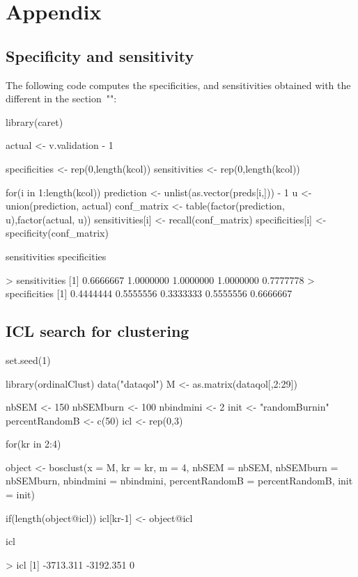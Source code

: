 \newpage 





\newpage
\thispagestyle{empty}
\section{Appendix}
\renewcommand{\thesubsection}{A\arabic{subsection}}
\setcounter{subsection}{0}

\setcounter{figure}{0}
\setcounter{table}{0}
\makeatletter 
\renewcommand{\thefigure}{A\@arabic\c@figure}
\makeatother

\subsection{Specificity and sensitivity}
\label{sec:appendix-spec-sens}
\noindent The following code computes the specificities, and sensitivities obtained with the different  in the section~"":

\begin{example}
library(caret)

actual <- v.validation - 1

specificities <- rep(0,length(kcol))
sensitivities <- rep(0,length(kcol))

for(i in 1:length(kcol)){
  prediction <- unlist(as.vector(preds[i,])) - 1
  u <- union(prediction, actual)
  conf_matrix <- table(factor(prediction, u),factor(actual, u))
  sensitivities[i] <- recall(conf_matrix)
  specificities[i] <- specificity(conf_matrix)
}

sensitivities
specificities
\end{example}
\begin{example}
> sensitivities
[1] 0.6666667 1.0000000 1.0000000 1.0000000 0.7777778
> specificities
[1] 0.4444444 0.5555556 0.3333333 0.5555556 0.6666667
\end{example}

\subsection{ICL search for clustering}
\label{sec:appendix-icl-clust}
\begin{example}
set.seed(1)

library(ordinalClust)
data("dataqol")
M <- as.matrix(dataqol[,2:29])

nbSEM <- 150
nbSEMburn <- 100
nbindmini <- 2
init <- "randomBurnin"
percentRandomB <- c(50)
icl <- rep(0,3)

for(kr in 2:4){
    object <- bosclust(x = M, kr = kr, m = 4, nbSEM = nbSEM,
                nbSEMburn = nbSEMburn, nbindmini = nbindmini, 
                percentRandomB = percentRandomB, init = init)

    if(length(object@icl)) icl[kr-1] <- object@icl  
}
icl
\end{example}
\begin{example}
> icl
[1] -3713.311 -3192.351 0   
\end{example}

